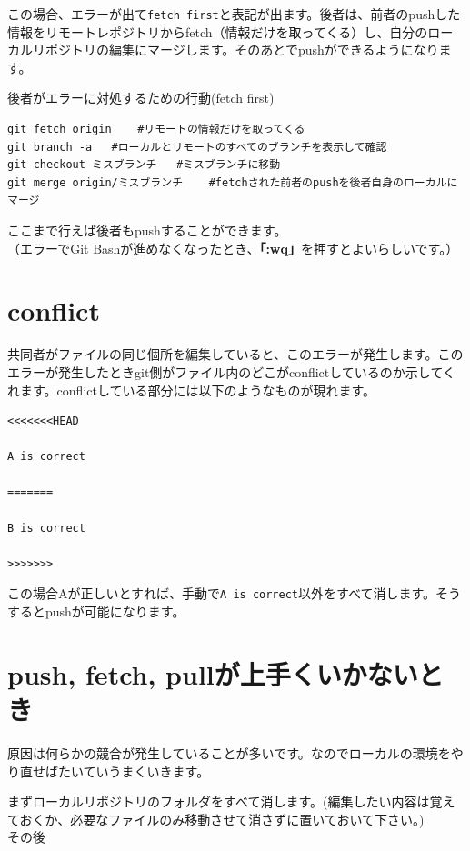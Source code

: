 \documentclass[
]{book}
\begin{document}
この場合、エラーが出て\texttt{fetch\ first}と表記が出ます。後者は、前者のpushした情報をリモートレポジトリからfetch（情報だけを取ってくる）し、自分のローカルリポジトリの編集にマージします。そのあとでpushができるようになります。

後者がエラーに対処するための行動(fetch first)

\begin{verbatim}
git fetch origin    #リモートの情報だけを取ってくる
git branch -a   #ローカルとリモートのすべてのブランチを表示して確認
git checkout ミスブランチ   #ミスブランチに移動
git merge origin/ミスブランチ    #fetchされた前者のpushを後者自身のローカルにマージ
\end{verbatim}

ここまで行えば後者もpushすることができます。\\
（エラーでGit Bashが進めなくなったとき、\textbf{「:wq」}を押すとよいらしいです。）

\hypertarget{conflict}{%
\section{conflict}\label{conflict}}

共同者がファイルの同じ個所を編集していると、このエラーが発生します。このエラーが発生したときgit側がファイル内のどこがconflictしているのか示してくれます。conflictしている部分には以下のようなものが現れます。

\begin{verbatim}
<<<<<<<HEAD

A is correct

=======

B is correct

>>>>>>>
\end{verbatim}

この場合Aが正しいとすれば、手動で\texttt{A\ is\ correct}以外をすべて消します。そうするとpushが可能になります。

\hypertarget{push-fetch-pullux304cux4e0aux624bux304fux3044ux304bux306aux3044ux3068ux304d}{%
\section{push, fetch, pullが上手くいかないとき}\label{push-fetch-pullux304cux4e0aux624bux304fux3044ux304bux306aux3044ux3068ux304d}}

原因は何らかの競合が発生していることが多いです。なのでローカルの環境をやり直せばたいていうまくいきます。

まずローカルリポジトリのフォルダをすべて消します。(編集したい内容は覚えておくか、必要なファイルのみ移動させて消さずに置いておいて下さい。)\\
その後
\end{document}
